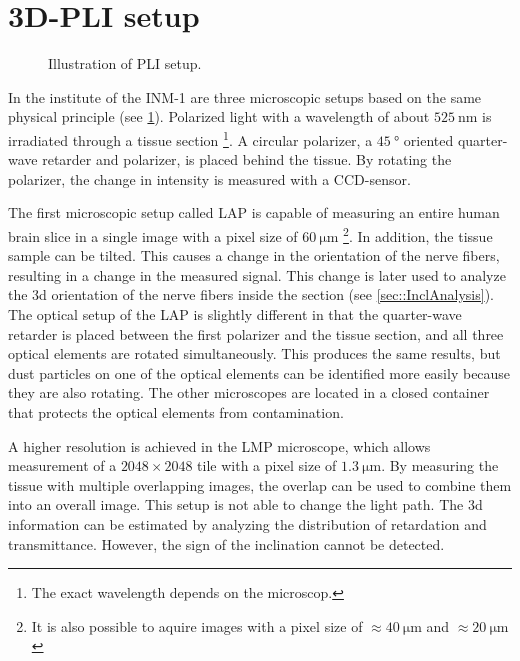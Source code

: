 \section{3D-PLI setup}\label{sec:expSetup}
%
\begin{figure}[!t]
    \captionsetup[sub]{position=top}
    \setlength{\tikzwidth}{\textwidth}
	\centering
	\caption{Illustration of PLI setup.}
	\label{fig:pli_setup}
\end{figure}
%
In the institute of the \ac{INM-1} are three microscopic setups based on the same physical principle \cite{Axer2011} (see \cref{fig:pli_setup}).
Polarized light with a wavelength of about $\SI{525}{\nano\meter}$ is irradiated through a tissue section \footnote{The exact wavelength depends on the microscop.}.
A circular polarizer, a $\SI{45}{\degree}$ oriented quarter-wave retarder and polarizer, is placed behind the tissue.
By rotating the polarizer, the change in intensity is measured with a \ac{CCD}-sensor.
\par
%
The first microscopic setup called \ac{LAP} is capable of measuring an entire human brain slice in a single image with a pixel size of $\SI{60}{\micro\meter}$ \footnote{It is also possible to aquire images with a pixel size of $\approx \SI{40}{\micro\meter}$ and $\approx \SI{20}{\micro\meter}$}.
In addition, the tissue sample can be tilted.
This causes a change in the orientation of the nerve fibers, resulting in a change in the measured signal.
This change is later used to analyze the 3d orientation of the nerve fibers inside the section (see \cref{sec::InclAnalysis}).
The optical setup of the \ac{LAP} is slightly different in that the quarter-wave retarder is placed between the first polarizer and the tissue section, and all three optical elements are rotated simultaneously.
This produces the same results, but dust particles on one of the optical elements can be identified more easily because they are also rotating.
The other microscopes are located in a closed container that protects the optical elements from contamination.
\par
% 
A higher resolution is achieved in the \ac{LMP} microscope, which allows measurement of a $\num{2048}\times\num{2048}$ tile with a pixel size of $\SI{1.3}{\micro\meter}$.
By measuring the tissue with multiple overlapping images, the overlap can be used to combine them into an overall image.
This setup is not able to change the light path.
The 3d information can be estimated by analyzing the distribution of retardation and transmittance.
However, the sign of the inclination cannot be detected.
